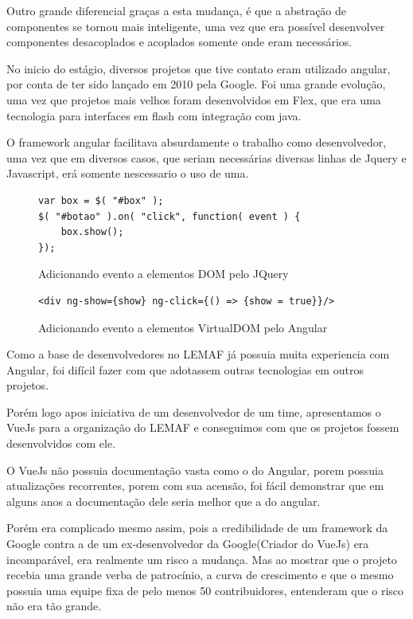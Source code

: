 Outro grande diferencial graças a esta mudança, é que a abstração de componentes se tornou mais inteligente, uma vez que era possível desenvolver componentes desacoplados e acoplados somente onde eram necessários.

No inicio do estágio, diversos projetos que tive contato eram utilizado angular, por conta de ter sido lançado em 2010 pela Google. Foi uma grande evolução, uma vez que projetos mais velhos foram desenvolvidos em Flex, que era uma tecnologia para interfaces em flash com integração com java.

O framework angular facilitava absurdamente o trabalho como desenvolvedor, uma vez que em diversos casos, que seriam necessárias diversas linhas de Jquery e Javascript, erá somente nescessario o uso de uma.


\begin{figure}[!htb]
\centering
\caption{Adicionando evento a elementos DOM pelo JQuery} %
\begin{lstlisting}
var box = $( "#box" );
$( "#botao" ).on( "click", function( event ) {
    box.show();
});
\end{lstlisting} 
\label{fig:exemplocodigo1} %
\end{figure}

\begin{figure}[!htb]
\centering
\caption{Adicionando evento a elementos VirtualDOM pelo Angular} %
\begin{lstlisting}
<div ng-show={show} ng-click={() => {show = true}}/>
\end{lstlisting} 
\label{fig:exemplocodigo1} %
\end{figure}
    

Como a base de desenvolvedores no LEMAF já possuia muita experiencia com Angular, foi difícil fazer com que adotassem outras tecnologias em outros projetos.

Porém logo apos iniciativa de um desenvolvedor de um time, apresentamos o VueJs para a organização do LEMAF e conseguimos com que os projetos fossem desenvolvidos com ele.

O VueJs não possuia documentação vasta como o do Angular, porem possuia atualizações recorrentes, porem com sua acensão, foi fácil demonstrar que em alguns anos a documentação dele seria melhor que a do angular.

Porém era complicado mesmo assim, pois a credibilidade de um framework da Google contra a de um ex-desenvolvedor da Google(Criador do VueJs) era incomparável, era realmente um risco a mudança. 
Mas ao mostrar que o projeto recebia uma grande verba de patrocínio, a curva de crescimento e que o mesmo possuia uma equipe fixa de pelo menos 50 contribuidores, entenderam que o risco não era tão grande.

